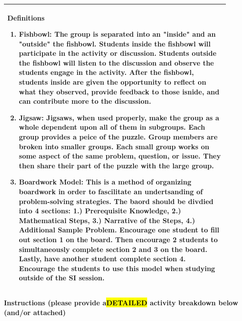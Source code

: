 \documentclass{article}
\begin{document}
\vspace{0.5cm}
\noindent
\begin{tabular}{|p{0.9\linewidth}|}
\hline
{\large\textbf{Definitions}}
\begin{enumerate}
   \item\textbf{Fishbowl:} The group is separated into an "inside" and an "outside" the fishbowl. Students inside the fishbowl will participate in the activity or discussion. Students outside the fishbowl will listen to the discussion and observe the students engage in the activity. After the fishbowl, students inside are given the opportunity to reflect on what they observed, provide feedback to those isnide, and can contribute more to the discussion.
   \item\textbf{Jigsaw:} Jigsaws, when used properly, make the group as a whole dependent upon all of them in subgroups. Each group provides a peice of the puzzle. Group members are broken into smaller groups. Each small group works on some aspect of the same problem, question, or issue. They then share their part of the puzzle with the large group.
   \item\textbf{Boardwork Model:} This is a method of organizing boardwork in order to fascilitate an undertsanding of problem-solving strategies. The baord should be divdied into 4 sections: 1.) Prerequisite Knowledge, 2.) Mathematical Steps, 3.) Narrative of the Steps, 4.) Additional Sample Problem. Encourage one student to fill out section 1 on the board. Then encourage 2 students to simultaneously complete section 2 and 3 on the board. Lastly, have another student complete section 4. Encourage the students to use this model when studying outside of the SI session.
\end{enumerate}
\\ \hline
\end{tabular}
\newpage
{\large\textbf{Instructions (please provide a\hl{DETAILED} activity breakdown below (and/or attached)}}\\
\end{document}
